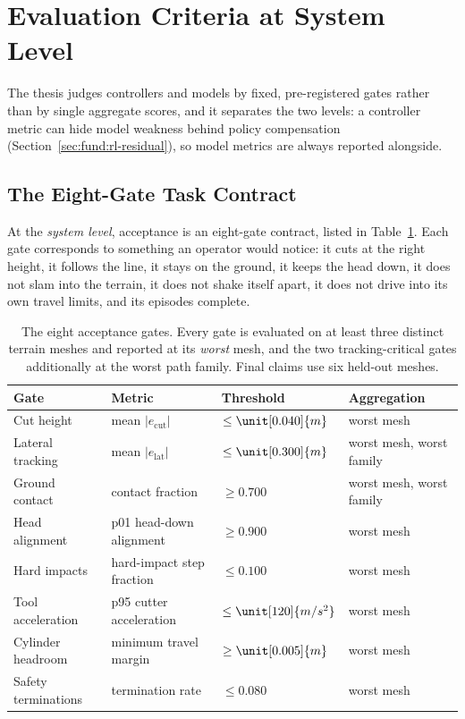 \section{Evaluation Criteria at System Level}
\label{sec:sys:evaluation-criteria}

The thesis judges controllers and models by fixed, pre-registered
gates rather than by single aggregate scores, and it separates the two levels: a controller metric can hide model weakness behind
policy compensation (Section~\ref{sec:fund:rl-residual}), so model
metrics are always reported alongside.

\subsection{The Eight-Gate Task Contract}

At the \emph{system level}, acceptance is an eight-gate contract, listed
in Table~\ref{tab:sys:gates}. Each gate corresponds to something an
operator would notice: it cuts at the right height, it follows the line,
it stays on the ground, it keeps the head down, it does not slam into
the terrain, it does not shake itself apart, it does not drive into its
own travel limits, and its episodes complete.

\begin{table}[tb]
  \centering
  \caption{The eight acceptance gates. Every gate is evaluated on at
  least three distinct terrain meshes and reported at its \emph{worst}
  mesh, and the two tracking-critical gates additionally at the worst
  path family. Final claims use six held-out meshes.}
  \label{tab:sys:gates}
  \small
  \begin{tabular}{llll}
    \toprule
    Gate & Metric & Threshold & Aggregation \\
    \midrule
    Cut height        & mean $|e_{\mathrm{cut}}|$
                      & $\leq \unit[0.040]{m}$ & worst mesh \\
    Lateral tracking  & mean $|e_{\mathrm{lat}}|$
                      & $\leq \unit[0.300]{m}$ & worst mesh, worst family \\
    Ground contact    & contact fraction
                      & $\geq 0.700$ & worst mesh, worst family \\
    Head alignment    & p01 head-down alignment
                      & $\geq 0.900$ & worst mesh \\
    Hard impacts      & hard-impact step fraction
                      & $\leq 0.100$ & worst mesh \\
    Tool acceleration & p95 cutter acceleration
                      & $\leq \unit[120]{m/s^2}$ & worst mesh \\
    Cylinder headroom & minimum travel margin
                      & $\geq \unit[0.005]{m}$ & worst mesh \\
    Safety terminations & termination rate
                      & $\leq 0.080$ & worst mesh \\
    \bottomrule
  \end{tabular}
\end{table}

